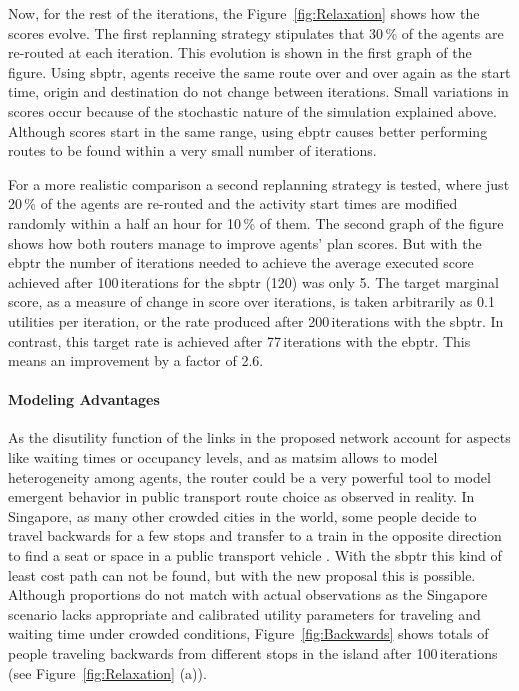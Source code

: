 Now, for the rest of the iterations, the Figure~\ref{fig:Relaxation} shows how the scores evolve. The first replanning strategy stipulates that 30\,\% of the agents are re-routed at each iteration. This evolution is shown in the first graph of the figure. Using \gls{sbptr}, agents receive the same route over and over again as the start time, origin and destination do not change between iterations. Small variations in scores occur because of the stochastic nature of the simulation explained above. Although scores start in the same range, using \gls{ebptr} causes better performing routes to be found within a very small number of iterations.

For a more realistic comparison a second replanning strategy is tested, where just 20\,\% of the agents are re-routed and the activity start times are modified randomly within a half an hour for 10\,\% of them. The second graph of the figure shows how both routers manage to improve agents' plan scores. But with the \gls{ebptr} the number of iterations needed to achieve the average executed score achieved after 100\,iterations for the \gls{sbptr} (120) was only 5. The target marginal score, as a measure of change in score over iterations, is taken arbitrarily as 0.1\,utilities per iteration, or the rate produced after 200\,iterations with the \gls{sbptr}. In contrast, this target rate is achieved after 77\,iterations with the \gls{ebptr}. This means an improvement by a factor of 2.6.

\paragraph{Modeling Advantages}

As the disutility function of the links in the proposed network account for aspects like waiting times or occupancy levels, and as \gls{matsim} allows to model heterogeneity among agents, the router could be a very powerful tool to model emergent behavior in public transport route choice as observed in reality. In Singapore, as many other crowded cities in the world, some people decide to travel backwards for a few stops and transfer to a train in the opposite direction to find a seat or space in a public transport vehicle \cite{ChakirovErath_HKSTS_2011}. With the \gls{sbptr} this kind of least cost path can not be found, but with the new proposal this is possible. Although proportions do not match with actual observations as the Singapore scenario lacks appropriate and calibrated utility parameters for traveling and waiting time under crowded conditions, Figure~\ref{fig:Backwards} shows totals of people traveling backwards from different stops in the island after 100\,iterations (see Figure~\ref{fig:Relaxation} (a)).

